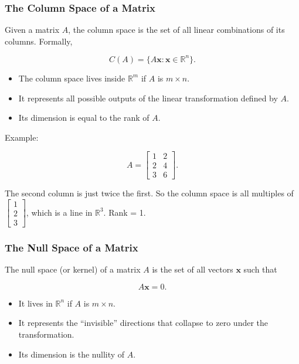 \documentclass[
  letterpaper,
  DIV=11,
  numbers=noendperiod]{scrreprt}
\providecommand{\tightlist}{%
  \setlength{\itemsep}{0pt}\setlength{\parskip}{0pt}}
\begin{document}
\subsubsection{The Column Space of a
Matrix}\label{the-column-space-of-a-matrix}

Given a matrix \(A\), the column space is the set of all linear
combinations of its columns. Formally,

\[
C(A) = \{ A\mathbf{x} : \mathbf{x} \in \mathbb{R}^n \}.
\]

\begin{itemize}
\tightlist
\item
  The column space lives inside \(\mathbb{R}^m\) if \(A\) is
  \(m \times n\).
\item
  It represents all possible outputs of the linear transformation
  defined by \(A\).
\item
  Its dimension is equal to the rank of \(A\).
\end{itemize}

Example:

\[
A = \begin{bmatrix}  
1 & 2 \\  
2 & 4 \\  
3 & 6  
\end{bmatrix}.
\]

The second column is just twice the first. So the column space is all
multiples of \(\begin{bmatrix}1 \\ 2 \\ 3\end{bmatrix}\), which is a
line in \(\mathbb{R}^3\). Rank = 1.

\subsubsection{The Null Space of a
Matrix}\label{the-null-space-of-a-matrix}

The null space (or kernel) of a matrix \(A\) is the set of all vectors
\(\mathbf{x}\) such that

\[
A\mathbf{x} = 0.
\]

\begin{itemize}
\tightlist
\item
  It lives in \(\mathbb{R}^n\) if \(A\) is \(m \times n\).
\item
  It represents the ``invisible'' directions that collapse to zero under
  the transformation.
\item
  Its dimension is the nullity of \(A\).
\end{itemize}
\end{document}
